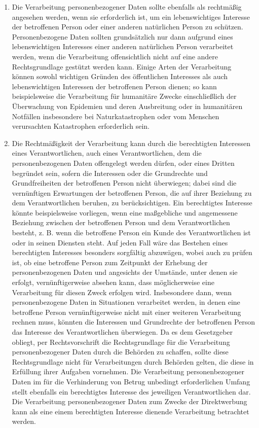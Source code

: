 \begin{enumerate}
   \item Die Verarbeitung personenbezogener Daten sollte ebenfalls als rechtmäßig angesehen werden, wenn sie
    erforderlich ist, um ein lebenswichtiges Interesse der betroffenen Person oder einer anderen natürlichen Person zu
    schützen. Personenbezogene Daten sollten grundsätzlich nur dann aufgrund eines lebenswichtigen Interesses einer
    anderen natürlichen Person verarbeitet werden, wenn die Verarbeitung offensichtlich nicht auf eine andere
    Rechtsgrundlage gestützt werden kann. Einige Arten der Verarbeitung können sowohl wichtigen Gründen des
    öffentlichen Interesses als auch lebenswichtigen Interessen der betroffenen Person dienen; so kann beispielsweise
    die Verarbeitung für humanitäre Zwecke einschließlich der Überwachung von Epidemien und deren Ausbreitung oder in
    humanitären Notfällen insbesondere bei Naturkatastrophen oder vom Menschen verursachten Katastrophen erforderlich
    sein.%
   \label{eg:46}
   

   \item Die Rechtmäßigkeit der Verarbeitung kann durch die berechtigten Interessen eines Verantwortlichen, auch eines
    Verantwortlichen, dem die personenbezogenen Daten offengelegt werden dürfen, oder eines Dritten begründet sein,
    sofern die Interessen oder die Grundrechte und Grundfreiheiten der betroffenen Person nicht überwiegen; dabei sind
    die vernünftigen Erwartungen der betroffenen Person, die auf ihrer Beziehung zu dem Verantwortlichen beruhen, zu
    berücksichtigen. Ein berechtigtes Interesse könnte beispielsweise vorliegen, wenn eine maßgebliche und angemessene
    Beziehung zwischen der betroffenen Person und dem Verantwortlichen besteht, z. B. wenn die betroffene Person ein
    Kunde des Verantwortlichen ist oder in seinen Diensten steht. Auf jeden Fall wäre das Bestehen eines berechtigten
    Interesses besonders sorgfältig abzuwägen, wobei auch zu prüfen ist, ob eine betroffene Person zum Zeitpunkt der
    Erhebung der personenbezogenen Daten und angesichts der Umstände, unter denen sie erfolgt, vernünftigerweise
    absehen kann, dass möglicherweise eine Verarbeitung für diesen Zweck erfolgen wird. Insbesondere dann, wenn
    personenbezogene Daten in Situationen verarbeitet werden, in denen eine betroffene Person vernünftigerweise nicht
    mit einer weiteren Verarbeitung rechnen muss, könnten die Interessen und Grundrechte der betroffenen Person das
    Interesse des Verantwortlichen überwiegen. Da es dem Gesetzgeber obliegt, per Rechtsvorschrift die Rechtsgrundlage
    für die Verarbeitung personenbezogener Daten durch die Behörden zu schaffen, sollte diese Rechtsgrundlage nicht für
    Verarbeitungen durch Behörden gelten, die diese in Erfüllung ihrer Aufgaben vornehmen. Die Verarbeitung
    personenbezogener Daten im für die Verhinderung von Betrug unbedingt erforderlichen Umfang stellt ebenfalls ein
    berechtigtes Interesse des jeweiligen Verantwortlichen dar. Die Verarbeitung personenbezogener Daten zum Zwecke der
    Direktwerbung kann als eine einem berechtigten Interesse dienende Verarbeitung betrachtet werden.%
   \label{eg:47}
   

\end{enumerate}
